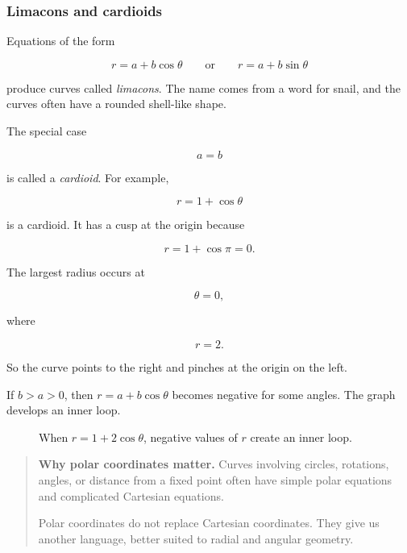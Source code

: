 \subsubsection*{Limacons and cardioids}

Equations of the form

\[
r=a+b\cos\theta
\qquad\text{or}\qquad
r=a+b\sin\theta
\]

produce curves called \emph{limacons}.  The name comes from a word for snail, and the
curves often have a rounded shell-like shape.

The special case

\[
a=b
\]

is called a \emph{cardioid}.  For example,

\[
r=1+\cos\theta
\]

is a cardioid.  It has a cusp at the origin because

\[
r=1+\cos\pi=0.
\]

The largest radius occurs at

\[
\theta=0,
\]

where

\[
r=2.
\]

So the curve points to the right and pinches at the origin on the left.

If \(b>a>0\), then \(r=a+b\cos\theta\) becomes negative for some angles.  The graph
develops an inner loop.

\begin{figure}[h]
\centering
{}
\caption{When \(r=1+2\cos\theta\), negative values of \(r\) create an inner loop.}
\label{fig:limacon-inner-loop}
\end{figure}

\begin{quote}
\textbf{Why polar coordinates matter.}
Curves involving circles, rotations, angles, or distance from a fixed point often have
simple polar equations and complicated Cartesian equations.

Polar coordinates do not replace Cartesian coordinates.  They give us another language,
better suited to radial and angular geometry.
\end{quote}

